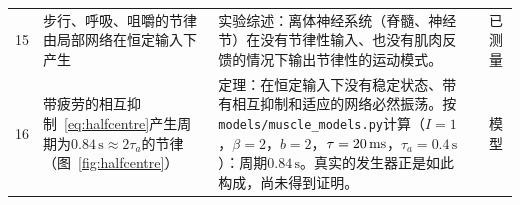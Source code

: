 {\begin{longtable}{>{\raggedright}p{0.5cm}>{\raggedright}p{4.0cm}>{\raggedright}p{5.6cm}>{\raggedright}p{2.3cm}>{\raggedright\arraybackslash}p{1.7cm}}
15 & 步行、呼吸、咀嚼的节律由局部网络在恒定输入下产生 & 实验综述：离体神经系统（脊髓、神经节）在没有节律性输入、也没有肌肉反馈的情况下输出节律性的运动模式。 & \cite{MarderBucher2001} & 已测量 \\
16 & 带疲劳的相互抑制~\eqref{eq:halfcentre}产生周期为$0.84\,\text{s}\approx2\tau_a$的节律（图~\ref{fig:halfcentre}） & 定理：在恒定输入下没有稳定状态、带有相互抑制和适应的网络必然振荡。按\texttt{models/\allowbreak muscle\_\allowbreak models.py}计算（$I=1$，$\beta=2$，$b=2$，$\tau=20\,\text{ms}$，$\tau_a=0.4\,\text{s}$）：周期$0.84\,\text{s}$。真实的发生器正是如此构成，尚未得到证明。 & \cite{Matsuoka1985osc} & 模型 \\
\bottomrule
\end{longtable}}

